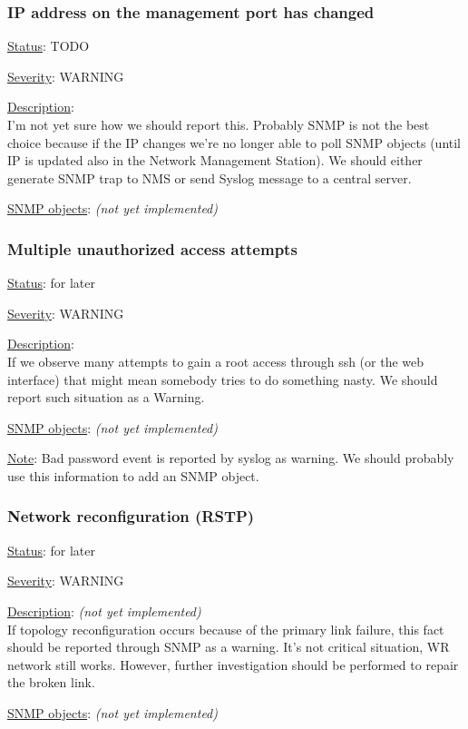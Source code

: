 \subsubsection{\bf IP address on the management port has changed}
		\begin{packed_enum}
			\item [] \underline{Status}: TODO
			\item [] \underline{Severity}: WARNING
			\item [] \underline{Description}:\\
				I'm not yet sure how we should report this. Probably SNMP is not the
				best choice because if the IP changes we're no longer able to poll SNMP
				objects (until IP is updated also in the Network Management Station). We
				should either generate SNMP trap to NMS or send Syslog message to a
				central server.
			\item [] \underline{SNMP objects}: \emph{(not yet implemented)}
		\end{packed_enum}

\subsubsection{\bf Multiple unauthorized access attempts}
		\begin{packed_enum}
			\item [] \underline{Status}: for later
			\item [] \underline{Severity}: WARNING
			\item [] \underline{Description}:\\
				If we observe many attempts to gain a root access through ssh (or the
				web interface) that might mean somebody tries to do something nasty. We
				should report such situation as a Warning.
			\item [] \underline{SNMP objects}: \emph{(not yet implemented)}
			\item [] \underline{Note}: Bad password event is reported by syslog as
				warning. We should probably use this information to add an SNMP object.
		\end{packed_enum}

\subsubsection{\bf Network reconfiguration (RSTP)}
		\label{fail:other:rstp}
		\begin{packed_enum}
			\item [] \underline{Status}: for later
			\item [] \underline{Severity}: WARNING
			\item [] \underline{Description}: \emph{(not yet implemented)}\\
				If topology reconfiguration occurs because of the primary link failure,
				this fact should be reported through SNMP as a warning. It's not
				critical situation, WR network still works. However, further
				investigation should be performed to repair the broken link.
			\item [] \underline{SNMP objects}: \emph{(not yet implemented)}
		\end{packed_enum}


